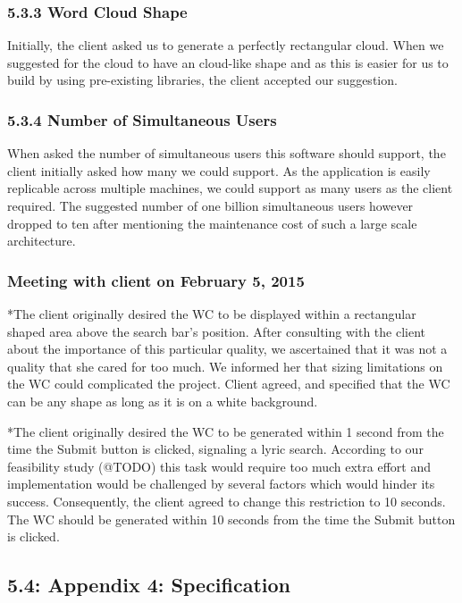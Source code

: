 \documentclass[]{article}
\begin{document}
\subsubsection{5.3.3 Word Cloud Shape}\label{word-cloud-shape}

Initially, the client asked us to generate a perfectly rectangular
cloud. When we suggested for the cloud to have an cloud-like shape and
as this is easier for us to build by using pre-existing libraries, the
client accepted our suggestion.

\subsubsection{5.3.4 Number of Simultaneous
Users}\label{number-of-simultaneous-users}

When asked the number of simultaneous users this software should
support, the client initially asked how many we could support. As the
application is easily replicable across multiple machines, we could
support as many users as the client required. The suggested number of
one billion simultaneous users however dropped to ten after mentioning
the maintenance cost of such a large scale architecture.

\subsubsection{Meeting with client on February 5,
2015}\label{meeting-with-client-on-february-5-2015}

*The client originally desired the WC to be displayed within a
rectangular shaped area above the search bar's position. After
consulting with the client about the importance of this particular
quality, we ascertained that it was not a quality that she cared for too
much. We informed her that sizing limitations on the WC could
complicated the project. Client agreed, and specified that the WC can be
any shape as long as it is on a white background.

*The client originally desired the WC to be generated within 1 second
from the time the Submit button is clicked, signaling a lyric search.
According to our feasibility study (@TODO) this task would require too
much extra effort and implementation would be challenged by several
factors which would hinder its success. Consequently, the client agreed
to change this restriction to 10 seconds. The WC should be generated
within 10 seconds from the time the Submit button is clicked.

\subsection{5.4: Appendix 4:
Specification}\label{appendix-4-specification}
\end{document}
